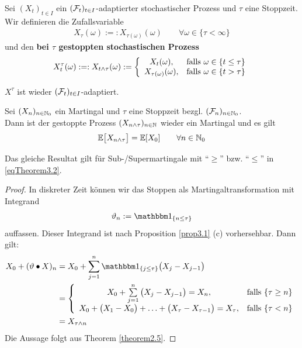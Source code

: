 \begin{defi}
Sei $(X_t)_{t\in I}$ ein $(\mathcal{F}_t)_{t\in I}$-adaptierter stochastischer Prozess und $\tau$ eine Stoppzeit. Wir definieren die Zufallsvariable
\begin{align*}
X_\tau(\omega):=:X_{\tau(\omega)}(\omega)\qquad\forall \omega\in\lbrace\tau<\infty\rbrace
\end{align*} 
und den \textbf{bei $\tau$ gestoppten stochastischen Prozess}
\begin{align*}
X_t^\tau(\omega):=:X_{t\wedge\tau}(\omega):=\left\lbrace\begin{array}{cl}
X_t(\omega), & \text{falls } \omega\in\lbrace t\leq\tau\rbrace\\
X_{\tau(\omega)}(\omega), &\text{falls }\omega\in\lbrace t>\tau\rbrace
\end{array}\right.
\end{align*}
\end{defi}

\begin{bemerkung}
$X^\tau$ ist wieder $(\mathcal{F}_t)_{t\in I}$-adaptiert.
\end{bemerkung}

\begin{theorem}\label{theorem3.2}
Sei $(X_n)_{n\in\mathbb{N}_0}$ ein Martingal und $\tau$ eine Stoppzeit bezgl. $(\mathcal{F}_n)_{n\in\mathbb{N}_0}$.\\
Dann ist der gestoppte Prozess $(X_{n\wedge\tau})_{n\in\mathbb{N}}$ wieder ein Martingal und es gilt
\begin{align}\label{eqTheorem3.2}
\mathbb{E}\big[X_{n\wedge\tau}\big]=\mathbb{E}[X_0]\qquad\forall n\in\mathbb{N}_0
\end{align}
\end{theorem}

\begin{bemerkung}
Das gleiche Resultat gilt für Sub-/Supermartingale mit ``$\geq$'' bzw. ``$\leq$'' in \eqref{eqTheorem3.2}.
\end{bemerkung}

\begin{proof}
In diskreter Zeit können wir das Stoppen als Martingaltransformation mit Integrand
\begin{align*}
\vartheta_n:=\indi_{\lbrace n\leq\tau\rbrace}
\end{align*}
auffassen. Dieser Integrand ist nach Proposition \ref{prop3.1} (c) vorhersehbar. Dann gilt:
\begin{align*}
X_0+(\vartheta\bullet X)_n&=
X_0+\sum\limits_{j=1}^n\indi_{\lbrace j\leq\tau\rbrace}\big(X_j-X_{j-1}\big)\\
&=\left\lbrace\begin{array}{cl}
X_0+\sum\limits_{j=1}^n\big(X_j-X_{j-1}\big)=X_n,&\falls\lbrace\tau\geq n\rbrace\\
X_0+\big(X_1-X_0\big)+\ldots+\big(X_\tau-X_{\tau-1}\big)=X_\tau, &\falls \lbrace\tau<n\rbrace
\end{array}\right.\\
&=X_{\tau\wedge n}
\end{align*}
Die Aussage folgt aus Theorem \ref{theorem2.5}.
\end{proof}

